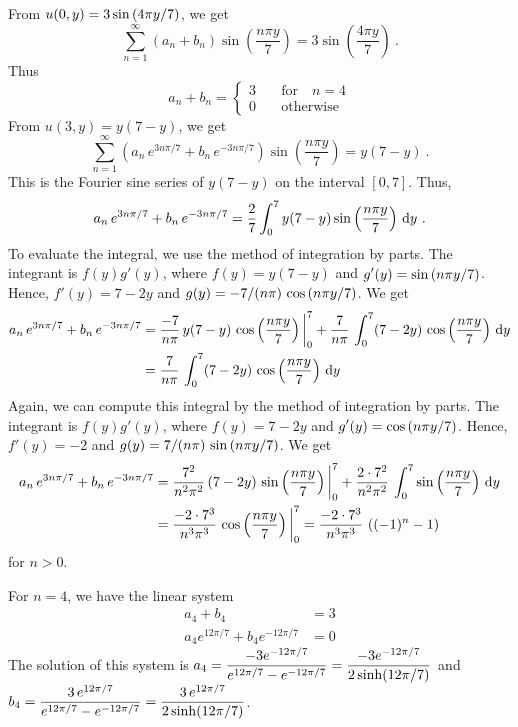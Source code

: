 \begin{egg}
From $\displaystyle u(0,y) = 3\sin\left(4\pi y/7\right)$, we
get
\[
\sum_{n=1}^\infty \left(a_n+ b_n\right)\sin\left(\frac{n\pi y}{7}\right) =
3\sin\left(\frac{4\pi y}{7}\right) \ .
\]
Thus
\[
a_n + b_n =
\begin{cases}
3 & \quad \text{for} \quad n=4 \\  
0 & \quad \text{otherwise}
\end{cases}
\]
From $u(3,y) = y(7-y)$, we get
\[
\sum_{n=1}^\infty \left(a_n\,e^{3n\pi /7}
+ b_n\,e^{-3n\pi /7}\right)\sin\left(\frac{n\pi y}{7}\right) = y(7-y) \ .
\]
This is the Fourier sine series of $y(7-y)$ on the interval $[0,7]$.
Thus,
\[
a_n\,e^{3n\pi /7} + b_n\,e^{-3n\pi /7} =
\frac{2}{7}\int_0^7 y(7-y) \sin\left(\frac{n\pi y}{7}\right) \dx{y} \ .
\]
To evaluate the integral, we use the method of integration by
parts.  The integrant is $f(y)g'(y)$, where $f(y)=y(7-y)$ and
$\displaystyle g'(y) = \sin\left(n\pi y/7\right)$.  Hence,
$f'(y) = 7-2y$ and
$\displaystyle g(y) = -7/(n\pi)\,\cos\left(n\pi y/7\right)$.
We get
\begin{align*}
a_n\,e^{3n\pi /7} + b_n\,e^{-3n\pi /7}
&= \frac{-7}{n\pi}\,y(7-y)\,\cos\left(\frac{n\pi y}{7}\right)\bigg|_0^7 +
\frac{7}{n\pi}\,\int_0^7 (7-2y)\,\cos\left(\frac{n\pi y}{7}\right)\,\mathrm{d}{y} \\
&= \frac{7}{n\pi}\,\int_0^7 (7-2y)\,\cos\left(\frac{n\pi y}{7}\right)\,\mathrm{d}{y}
\end{align*}
Again, we can compute this integral by the method of integration by
parts.  The integrant is $f(y)g'(y)$, where $f(y)=7-2y$ and
$\displaystyle g'(y) = \cos\left(n\pi y/7\right)$.  Hence,
$f'(y) = -2$ and $\displaystyle g(y) =
7/(n\pi) \,\sin\left(n\pi y/7\right)$.  We get
\begin{align*}
a_n\,e^{3n\pi /7} + b_n\,e^{-3n\pi /7}
&= \frac{7^2}{n^2\pi^2}\,(7-2y)\,\sin\left(\frac{n\pi y}{7}\right)\bigg|_0^7 +
\frac{2\cdot 7^2}{n^2\pi^2}\,\int_0^7
\sin\left(\frac{n\pi y}{7}\right)\,\mathrm{d}{y} \\
&= \frac{-2\cdot 7^3}{n^3\pi^3}\,\cos\left(\frac{n\pi y}{7}\right)\bigg|_0^7
= \frac{-2\cdot 7^3}{n^3\pi^3}\, \left((-1)^n - 1\right)
\end{align*}
for $n > 0$.

For $n=4$, we have the linear system
\begin{align*}
a_4 + b_4 &= 3 \\
a_4 e^{12\pi/7} + b_4 e^{-12\pi/7} &= 0
\end{align*}
The solution of this system is
$\displaystyle a_4 = \frac{-3 e^{-12\pi/7} }{e^{12\pi/7}-e^{-12\pi/7}}
= \frac{-3 e^{-12\pi/7} }{2\sinh(12\pi/7)}$
and \\
$\displaystyle b_4 = \frac{3\,e^{12\pi/7}}{e^{12\pi/7}-e^{-12\pi/7}}
= \frac{3\,e^{12\pi/7}}{2\sinh(12\pi/7)}$.


\end{egg}
